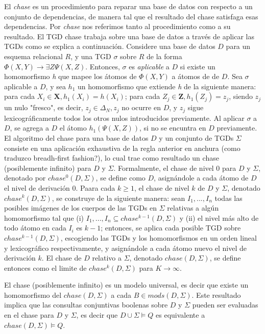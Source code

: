 \documentclass[11pt,a4paper,twoside]{tesis}
\theoremstyle{definition}
\begin{document}
El \textit{chase} es un procedimiento para reparar una base de datos con respecto a un conjunto de dependencias, de manera tal que el resultado del chase satisfaga esas dependencias. Por \textit{chase} nos referimos tanto al procedimiento como a su resultado. El TGD chase trabaja sobre una base de datos a través de aplicar las TGDs como se explica a continuación. Considere una base de datos $D$ para un esquema relacional $R$, y una TGD $\sigma$ sobre $R$ de la forma $\Phi (X, Y) \rightarrow \exists Z \Psi (X, Z)$. Entonces, $\sigma$ es \textit{aplicable} a $D$ si existe un homomorfismo \textit{h} que mapee los átomos de $\Phi (X, Y)$ a átomos de  de $D$. Sea $\sigma$ aplicable a $D$, y sea $h_1$ un homomorfismo que extiende \textit{h} de la siguiente manera: para cada $X_i \in \textbf{X}, h_1(X_i) = h(X_i)$; para cada $Z_j \in \textbf{Z}, h_1(Z_j) = z_j$, siendo $z_j$ un nulo "fresco", es decir, $z_j \in \Delta_N, z_j$ no ocurre en $D$, y $z_j$ sigue lexicográficamente todos los otros nulos introducidos previamente. Al aplicar $\sigma$ a $D$, se agrega a $D$ el átomo $h_1(\Psi (X, Z))$, si no se encuntra en $D$ previamente.
El algoritmo del chase para una base de datos $D$ y un conjunto de TGDs $\Sigma$ consiste en una aplicación exhaustiva de la regla anterior en anchura (como traduzco breadh-first fashion?), lo cual trae como resultado un chase (posiblemente infinito) para $D$ y $\Sigma$. Formalmente, el chase de nivel 0 para $D$ y $\Sigma$, denotado por $chase^0(D,\Sigma)$, se define como $D$, asignándole a cada átomo de $D$ el nivel de derivación 0. Paara cada $k \geq 1$, el chase de nivel $k$ de $D$ y $\Sigma$, denotado $chase^k(D, \Sigma)$, se construye de la siguiente manera: sean $I_1,...,I_n$ todas las posibles imágenes de los cuerpos de las TGDs en $\Sigma$ relativas a algún homomorfismo tal que (i) $I_1,...,I_n \subseteq chase^{k-1}(D,\Sigma)$ y (ii) el nivel más alto de todo átomo en cada $I_i$ es $k - 1$; entonces, se aplica cada posible TGD sobre $chase^{k-1}(D,\Sigma)$, escogiendo las TGDs y los homomorfismos en un orden lineal y lexicográfico respectivamente, y asignándole a cada átomo nuevo el nivel de derivación $k$. El chase de $D$ relativo a $\Sigma$, denotado $chase(D,\Sigma)$, se define entonces como el limite de $chase^k(D,\Sigma)$ para $K \rightarrow \infty$. 

El chase (posiblemente infinito) es un modelo universal, es decir que existe un homomorfismo del $chase(D, \Sigma)$ a cada $B \in mods(D,\Sigma)$. Este resultado implica que las consultas conjuntivas boolenas sobre $D$ y $\Sigma$ pueden ser evaluadas en el chase para $D$ y $\Sigma$, es decir que $D \cup \Sigma \models Q$ es equivalente a $chase(D, \Sigma) \models Q$. 
\end{document}
